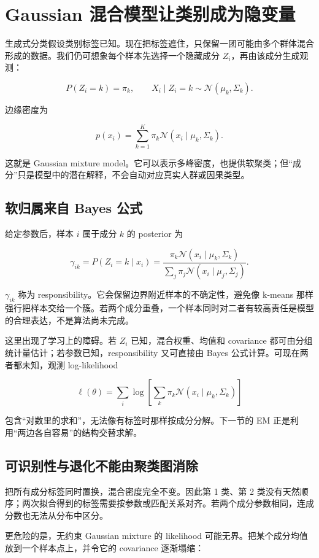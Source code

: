 \section{Gaussian 混合模型让类别成为隐变量}

生成式分类假设类别标签已知。现在把标签遮住，只保留一团可能由多个群体混合形成的数据。我们仍可想象每个样本先选择一个隐藏成分 \(Z_i\)，再由该成分生成观测：

\[
P(Z_i=k)=\pi_k,\qquad
X_i\mid Z_i=k\sim\mathcal N(\mu_k,\Sigma_k).
\]

边缘密度为

\[
p(x_i)=\sum_{k=1}^K
\pi_k\mathcal N(x_i\mid\mu_k,\Sigma_k).
\]

这就是 Gaussian mixture model。它可以表示多峰密度，也提供软聚类；但``成分''只是模型中的潜在解释，不会自动对应真实人群或因果类型。

\subsection{软归属来自 Bayes 公式}

给定参数后，样本 \(i\) 属于成分 \(k\) 的 posterior 为

\[
\gamma_{ik}
=P(Z_i=k\mid x_i)
=\frac{
\pi_k\mathcal N(x_i\mid\mu_k,\Sigma_k)
}{
\sum_j\pi_j\mathcal N(x_i\mid\mu_j,\Sigma_j)
}.
\]

\(\gamma_{ik}\) 称为 responsibility。它会保留边界附近样本的不确定性，避免像 k-means 那样强行把样本交给一个簇。若两个成分重叠，一个样本同时对二者有较高责任是模型的合理表达，不是算法尚未完成。

这里出现了学习上的障碍。若 \(Z_i\) 已知，混合权重、均值和 covariance 都可由分组统计量估计；若参数已知，responsibility 又可直接由 Bayes 公式计算。可现在两者都未知，观测 log-likelihood

\[
\ell(\theta)
=\sum_i\log
\left[
\sum_k\pi_k
\mathcal N(x_i\mid\mu_k,\Sigma_k)
\right]
\]

包含``对数里的求和''，无法像有标签时那样按成分分解。下一节的 EM 正是利用``两边各自容易''的结构交替求解。

\subsection{可识别性与退化不能由聚类图消除}

把所有成分标签同时置换，混合密度完全不变。因此第 1 类、第 2 类没有天然顺序；两次拟合得到的标签需要按参数或匹配关系对齐。若两个成分参数相同，连成分数也无法从分布中区分。

更危险的是，无约束 Gaussian mixture 的 likelihood 可能无界。把某个成分均值放到一个样本点上，并令它的 covariance 逐渐塌缩：

